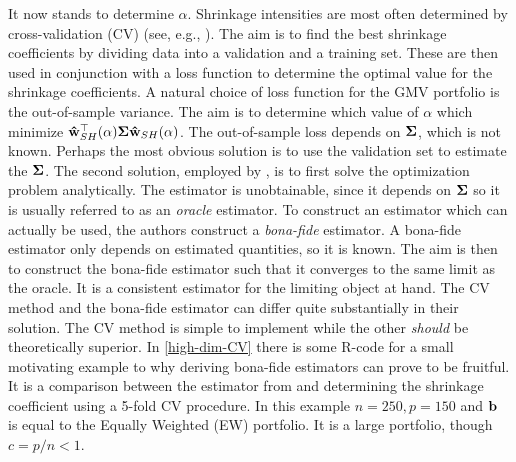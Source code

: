 \documentclass[12pt, oneside]{book}\usepackage{knitr}
\begin{document}
It now stands to determine $\alpha$. 
Shrinkage intensities are most often determined by cross-validation (CV) (see, e.g., \citet[ch. 5]{james2013introduction}). 
The aim is to find the best shrinkage coefficients by dividing data into a validation and a training set.
These are then used in conjunction with a loss function to determine the optimal value for the shrinkage coefficients.
A natural choice of loss function for the GMV portfolio is the out-of-sample variance.
The aim is to determine which value of $\alpha$ which minimize $\mathbf{\hat{w}}_{SH}^\top(\alpha) \mathbf{\Sigma} \mathbf{\hat{w}}_{SH}(\alpha)$.
The out-of-sample loss depends on $\mathbf{\Sigma}$, which is not known.
Perhaps the most obvious solution is to use the validation set to estimate the $\mathbf{\Sigma}$.
The second solution, employed by \citet{bodnar2018estimation}, is to first solve the optimization problem analytically.
The estimator is unobtainable, since it depends on $\mathbf{\Sigma}$ so it is usually referred to as an \textit{oracle} estimator. 
To construct an estimator which can actually be used, the authors construct a \textit{bona-fide} estimator.
A bona-fide estimator only depends on estimated quantities, so it is known.
The aim is then to construct the bona-fide estimator such that it converges to the same limit as the oracle. 
It is a consistent estimator for the limiting object at hand.
The CV method and the bona-fide estimator can differ quite substantially in their solution. 
The CV method is simple to implement while the other \textit{should} be theoretically superior.
In \ref{high-dim-CV} there is some R-code for a small motivating example to why deriving bona-fide estimators can prove to be fruitful.
It is a comparison between the estimator from \citet{bodnar2018estimation} and determining the shrinkage coefficient using a 5-fold CV procedure.
In this example $n=250, p=150$ and $\mathbf{b}$ is equal to the Equally Weighted (EW) portfolio.
It is a large portfolio, though $c=p/n<1$.
\end{document}
